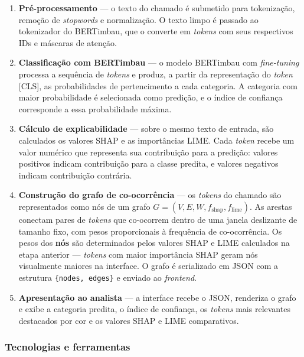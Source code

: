 \documentclass[
    12pt,                %
    openright,           %
    oneside,             %
    a4paper,             %
    english,             %
    brazil               %
]{abntex2}
\begin{document}
\begin{enumerate}
    \item \textbf{Pré-processamento} — o texto do chamado é submetido para tokenização, remoção de \textit{stopwords} e normalização. O texto limpo é passado ao tokenizador do BERTimbau, que o converte em \textit{tokens} com seus respectivos IDs e máscaras de atenção.

    \item \textbf{Classificação com BERTimbau} — o modelo BERTimbau com \textit{fine-tuning} processa a sequência de \textit{tokens} e produz, a partir da representação do \textit{token} [CLS], as probabilidades de pertencimento a cada categoria. A categoria com maior probabilidade é selecionada como predição, e o índice de confiança corresponde a essa probabilidade máxima.

    \item \textbf{Cálculo de explicabilidade} — sobre o mesmo texto de entrada, são calculados os valores SHAP e as importâncias LIME. Cada \textit{token} recebe um valor numérico que representa sua contribuição para a predição: valores positivos indicam contribuição para a classe predita, e valores negativos indicam contribuição contrária.

    \item \textbf{Construção do grafo de co-ocorrência} — os \textit{tokens} do chamado são representados como nós de um grafo $G = (V, E, W, f_{\text{shap}}, f_{\text{lime}})$. As arestas conectam pares de \textit{tokens} que co-ocorrem dentro de uma janela deslizante de tamanho fixo, com pesos proporcionais à frequência de co-ocorrência. Os pesos dos \textbf{nós} são determinados pelos valores SHAP e LIME calculados na etapa anterior — \textit{tokens} com maior importância SHAP geram nós visualmente maiores na interface. O grafo é serializado em JSON com a estrutura \texttt{\{nodes, edges\}} e enviado ao \textit{frontend}.

    \item \textbf{Apresentação ao analista} — a interface recebe o JSON, renderiza o grafo e exibe a categoria predita, o índice de confiança, os \textit{tokens} mais relevantes destacados por cor e os valores SHAP e LIME comparativos.
\end{enumerate}

\subsubsection{Tecnologias e ferramentas}
\end{document}
